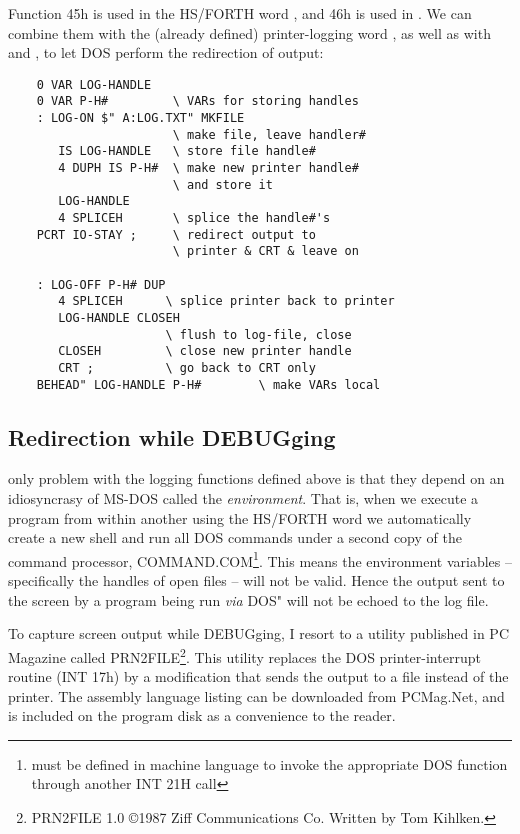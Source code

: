 Function 45h is used in the HS/FORTH word , and 46h is used in . We can combine them with the (already defined) printer-logging word , as well as with  and , to let DOS perform the redirection of output:

\begin{lstlisting}
    0 VAR LOG-HANDLE
    0 VAR P-H#         \ VARs for storing handles
    : LOG-ON $" A:LOG.TXT" MKFILE
                       \ make file, leave handler#
       IS LOG-HANDLE   \ store file handle#
       4 DUPH IS P-H#  \ make new printer handle#
                       \ and store it
       LOG-HANDLE
       4 SPLICEH       \ splice the handle#'s
    PCRT IO-STAY ;     \ redirect output to
                       \ printer & CRT & leave on

    : LOG-OFF P-H# DUP
       4 SPLICEH      \ splice printer back to printer
       LOG-HANDLE CLOSEH
                      \ flush to log-file, close
       CLOSEH         \ close new printer handle
       CRT ;          \ go back to CRT only
    BEHEAD" LOG-HANDLE P-H#        \ make VARs local
\end{lstlisting}

\subsection{Redirection while DEBUGging}

 only problem with the logging functions defined above is that they depend on an idiosyncrasy of MS-DOS called the \textit{environment}. That is, when we execute a program from within another using the HS/FORTH word  we automatically create a new shell and run all DOS commands under a second copy of the command processor, COMMAND.COM\footnote{ must be defined in machine language to invoke the appropriate DOS function through another INT 21H call}. This means the environment variables -- specifically the handles of open files -- will not be valid. Hence the output sent to the screen by a program being run \textit{via} DOS" will not be echoed to the log file.

To capture screen output while DEBUGging, I resort to a utility published in PC Magazine called PRN2FILE\footnote{PRN2FILE 1.0 \copyright 1987 Ziff Communications Co. Written by Tom Kihlken.}. This utility replaces the DOS printer-interrupt routine (INT 17h) by a modification that sends the output to a file instead of the printer. The assembly language listing can be downloaded from PCMag.Net, and is included on the program disk as a convenience to the reader.

